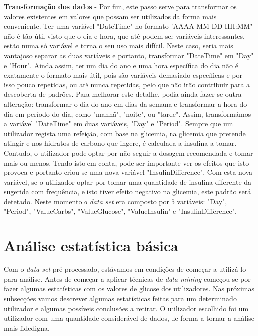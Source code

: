 \textbf{Transformação dos dados} - Por fim, este passo serve para transformar os valores existentes em valores que possam ser utilizados da forma mais conveniente. Ter uma variável "DateTime" no formato "AAAA-MM-DD HH:MM" não é tão útil visto que o dia e hora, que até podem ser variáveis interessantes, estão numa só variável e torna o seu uso mais difícil. Neste caso, seria mais vantajoso separar as duas variáveis e portanto, transformar "DateTime" em "Day" e "Hour". Ainda assim, ter um dia do ano e uma hora específica do dia não é exatamente o formato mais útil, pois são variáveis demasiado específicas e por isso pouco repetidas, ou até nunca repetidas, pelo que não irão contribuir para a descoberta de padrões. Para melhorar este detalhe, podia ainda fazer-se outra alteração: transformar o dia do ano em dias da semana e transformar a hora do dia em período do dia, como "manhã", "noite", ou "tarde". Assim, transformámos a variável "DateTime" em duas variáveis, "Day" e "Period".
Sempre que um utilizador regista uma refeição, com base na glicemia, na glicemia que pretende atingir e nos hidratos de carbono que ingere, é calculada a insulina a tomar. Contudo, o utilizador pode optar por não seguir a dosagem recomendada e tomar mais ou menos. Tendo isto em conta, pode ser importante ver os efeitos que isto provoca e portanto criou-se uma nova variável "Insulin\textunderscore Difference". Com esta nova variável, se o utilizador optar por tomar uma quantidade de insulina diferente da sugerida com frequência, e isto tiver efeito negativo na glicemia, este padrão será detetado. 
Neste momento o \textit{data set} era composto por 6 variáveis: "Day", "Period", "Value\textunderscore Carbs", "Value\textunderscore Glucose", "Value\textunderscore Insulin" e "Insulin\textunderscore Difference".

\section{Análise estatística básica}

Com o \textit{data set} pré-processado, estávamos em condições de começar a utilizá-lo para análise. Antes de começar a aplicar técnicas de \textit{data mining} começou-se por fazer algumas estatísticas com os valores de glicose dos utilizadores. Nas próximas subsecções vamos descrever algumas estatísticas feitas para um determinado utilizador e algumas possíveis conclusões a retirar. O utilizador escolhido foi um utilizador com uma quantidade considerável de dados, de forma a tornar a análise mais fidedigna.

